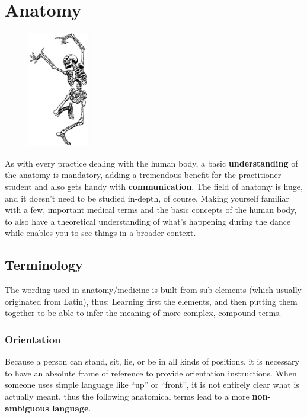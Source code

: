 \chapter{Anatomy}\label{ch:anatomy}

\begin{figure}
    \centering
    \includegraphics[width=0.25\textwidth]{images/anatomy}
\end{figure}

As with every practice dealing with the human body, a basic \textbf{understanding} of the anatomy is mandatory, adding a tremendous benefit for the practitioner-student and also gets handy with \textbf{communication}.
The field of anatomy is huge, and it doesn't need to be studied in-depth, of course.
Making yourself familiar with a few, important medical terms and the basic concepts of the human body, to also have a theoretical understanding of what's happening during the dance while enables you to see things in a broader context.

\section{Terminology}\label{sec:terminology}

The wording used in anatomy/medicine is built from sub-elements (which usually originated from Latin), thus:
Learning first the elements, and then putting them together to be able to infer the meaning of more complex, compound terms.

\subsection{Orientation}

Because a person can stand, sit, lie, or be in all kinds of positions, it is necessary to have an absolute frame of reference to provide orientation instructions.
When someone uses simple language like ``up'' or ``front'', it is not entirely clear what is actually meant, thus the following anatomical terms lead to a more \textbf{non-ambiguous language}.

